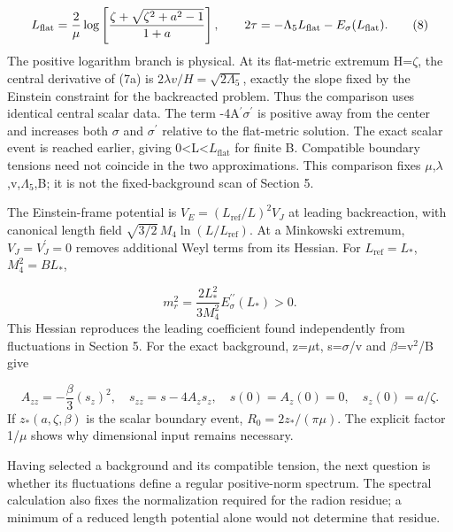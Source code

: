 \documentclass[11pt,a4paper]{article}
\begin{document}
\begin{equation}
L_{\rm flat}=\frac{2}{\mu}\log\left[\frac{\zeta+\sqrt{\zeta^2+a^2-1}}{1+a}\right],\qquad 2\tau=-\Lambda_5L_{\rm flat}-E_\sigma(L_{\rm flat}).\tag{8}
\end{equation}
The positive logarithm branch is physical. At its flat-metric extremum H=\ensuremath{\zeta}, the central derivative of (7a) is \ensuremath{2\lambda v/H=\sqrt{2\Lambda_5}}, exactly the slope fixed by the Einstein constraint for the backreacted problem. Thus the comparison uses identical central scalar data. The term -4A\ensuremath{{}^{\prime}}\ensuremath{\sigma}\ensuremath{{}^{\prime}} is positive away from the center and increases both \ensuremath{\sigma} and \ensuremath{\sigma}\ensuremath{{}^{\prime}} relative to the flat-metric solution. The exact scalar event is reached earlier, giving 0<L<\ensuremath{L_{\mathrm{flat}}} for finite B. Compatible boundary tensions need not coincide in the two approximations. This comparison fixes \ensuremath{\mu},\ensuremath{\lambda},v,\ensuremath{\Lambda}\ensuremath{{}_{5}},B; it is not the fixed-background scan of Section 5.

The Einstein-frame potential is \ensuremath{V_E=(L_{\mathrm{ref}}/L)^2V_J} at leading backreaction, with canonical length field \ensuremath{\sqrt{3/2}\,M_4\ln(L/L_{\mathrm{ref}})}. At a Minkowski extremum, \ensuremath{V_J=V_J^{\prime}=0} removes additional Weyl terms from its Hessian. For \ensuremath{L_{\mathrm{ref}}=L_*}, \ensuremath{M_4^2=BL_*},

\begin{equation}
m_r^2=\frac{2L_*^2}{3M_4^2}E_\sigma^{\prime\prime}(L_*)>0.\tag{9}
\end{equation}
This Hessian reproduces the leading coefficient found independently from fluctuations in Section 5. For the exact background, z=\ensuremath{\mu}t, s=\ensuremath{\sigma}/v and \ensuremath{\beta}=v\ensuremath{{}^{2}}/B give

\begin{equation}
A_{zz}=-\frac{\beta}{3}(s_z)^2,\quad s_{zz}=s-4A_zs_z,\quad s(0)=A_z(0)=0,\quad s_z(0)=a/\zeta.\tag{9b}
\end{equation}
If \ensuremath{z_*(a,\zeta,\beta)} is the scalar boundary event, \ensuremath{R_0=2z_*/(\pi\mu)}. The explicit factor 1/\ensuremath{\mu} shows why dimensional input remains necessary.

Having selected a background and its compatible tension, the next question is whether its fluctuations define a regular positive-norm spectrum. The spectral calculation also fixes the normalization required for the radion residue; a minimum of a reduced length potential alone would not determine that residue.
\end{document}
